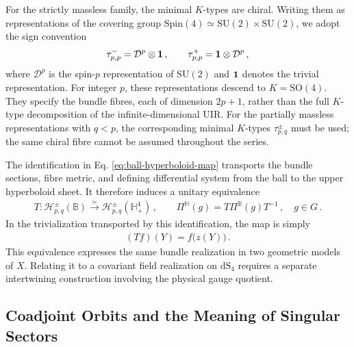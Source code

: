 \documentclass{SciPost}
\begin{document}
For the strictly massless family, the minimal $K$-types are chiral. Writing them as representations of the covering group $\mathrm{Spin}(4)\simeq\mathrm{SU}(2)\times\mathrm{SU}(2)$, we adopt the sign convention
\begin{align}\label{eq:compact-K-types}
    \tau_{p,p}^{-}=\mathcal D^p\otimes\mathbbm1
    \,, \qquad
    \tau_{p,p}^{+}=\mathbbm1\otimes\mathcal D^p \,,
\end{align}
where $\mathcal D^p$ is the spin-$p$ representation of $\mathrm{SU}(2)$ and $\mathbbm1$ denotes the trivial representation. For integer $p$, these representations descend to $K=\mathrm{SO}(4)$. They specify the bundle fibres, each of dimension $2p+1$, rather than the full $K$-type decomposition of the infinite-dimensional UIR. For the partially massless representations with $q<p$, the corresponding minimal $K$-types $\tau^\pm_{p,q}$ must be used; the same chiral fibre cannot be assumed throughout the series.

The identification in Eq. \eqref{eq:ball-hyperboloid-map} transports the bundle sections, fibre metric, and defining differential system from the ball to the upper hyperboloid sheet. It therefore induces a unitary equivalence
\begin{align}\label{eq:model-transport}
    T:\mathcal H_{p,q}^{\pm}(\mathbb B)
    \xrightarrow{\simeq}
    \mathcal H_{p,q}^{\pm}(\mathbb H^4_+)
    \,, \qquad
    \Pi^{\mathbb H}(g)
    =
    T\Pi^{\mathbb B}(g)T^{-1}
    \,, \quad g\in G \,.
\end{align}
In the trivialization transported by this identification, the map is simply
\begin{align}
    (Tf)(Y)=f\bigl(z(Y)\bigr) \,.
\end{align}
This equivalence expresses the same bundle realization in two geometric models of $X$. Relating it to a covariant field realization on $\mathrm{dS}_{4}$ requires a separate intertwining construction involving the physical gauge quotient.


\subsection{Coadjoint Orbits and the Meaning of Singular Sectors} \label{subsec:orbits}
\end{document}
